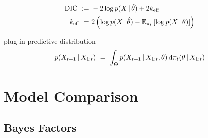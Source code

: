 \begin{definition}
\end{definition}



\begin{definition}
\begin{align*}
\textrm{DIC} ~ :=& ~ -2 \log p(X \,|\, \hat{\theta}) + 2 k_{\textrm{eff}} \\
k_{\textrm{eff}} ~ =& ~ 2 \left( \log p(X \,|\, \hat{\theta}) - \operatorname{\mathbb{E}}_{\pi_t} \left[ \log p(X \,|\, \theta) \right] \right)
\end{align*}
\end{definition}

\begin{definition}
\end{definition}

plug-in predictive distribution
\begin{equation*}
p(X_{t+1} \,|\, X_{1:t}) ~ = ~ \int_\Theta p(X_{t+1} \,|\, X_{1:t}, \theta) \, \textrm{d} \pi_t(\theta \,|\, X_{1:t})
\end{equation*}

\section{Model Comparison}

\subsection{Bayes Factors}